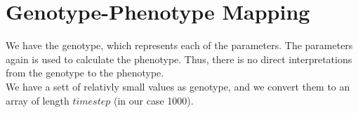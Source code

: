 \section{Genotype-Phenotype Mapping}

We have the genotype, which represents each of the parameters. The parameters
again is used to calculate the phenotype. Thus, there is no direct interpretations
from the genotype to the phenotype. \\

We have a sett of relativly small values as genotype, and we convert them to an
array of length $timestep$ (in our case 1000). 